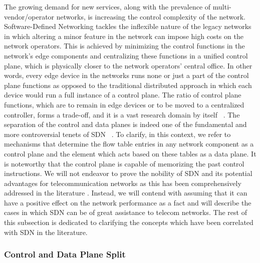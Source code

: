 The growing demand for new services, along with the prevalence of multi-vendor/operator networks, is increasing the control complexity of the network. Software-Defined Networking tackles the inflexible nature of the legacy networks in which altering a minor feature in the network can impose high costs on the network operators. This is achieved by minimizing the control functions in the network's edge components and centralizing these functions in a unified control plane, which is physically closer to the network operators' central office. In other words, every edge device in the networks runs none or just a part of the control plane functions as opposed to the traditional distributed approach in which each device would run a full instance of a control plane. The ratio of control plane functions, which are to remain in edge devices or to be moved to a centralized controller, forms a trade-off, and it is a vast research domain by itself ~\cite{Levin:2012:LCS:2342441.2342443}.
The separation of the control and data planes is indeed one of the fundamental and more controversial tenets of \ac{SDN} ~\cite{D.:2013:SSD:2566940}. To clarify, in this context, we refer to mechanisms that determine the flow table entries in any network component as a control plane and the element which acts based on these tables as a data plane. It is noteworthy that the control plane is capable of memorizing the past control instructions.
We will not endeavor to prove the nobility of \ac{SDN} and its potential advantages for telecommunication networks as this has been comprehensively addressed in the literature \cite{7947156}. Instead, we will contend with assuming that it can have a positive effect on the network performance as a fact and will describe the cases in which \ac{SDN} can be of great assistance to telecom networks.
The rest of this subsection is dedicated to clarifying the concepts which have been correlated with \ac{SDN} in the literature.

\subsubsection{Control and Data Plane Split}

